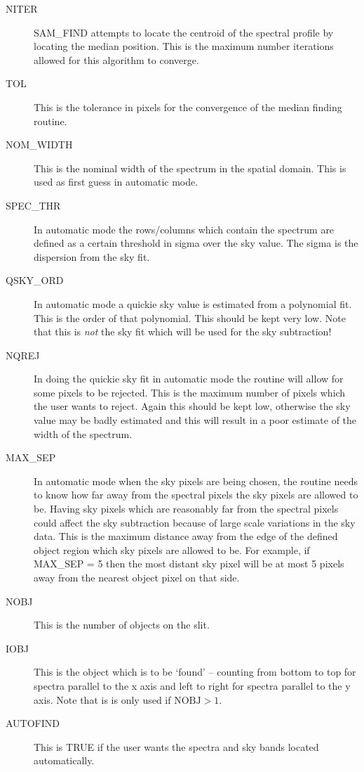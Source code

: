 \begin{description}
\begin{description}

\item[NITER] SAM\_FIND attempts to locate the centroid of the spectral profile
by locating the median position.  This is the maximum number iterations
allowed for this algorithm to converge.

\item[TOL] This is the tolerance in pixels for the convergence of the median
finding routine.

\item[NOM\_WIDTH] This is the nominal width of the spectrum in the spatial
domain.  This is used as first guess in automatic mode.

\item[SPEC\_THR] In automatic mode the rows/columns which contain the spectrum
are defined as a certain threshold in sigma over the sky value.  The sigma is
the dispersion from the sky fit.

\item[QSKY\_ORD] In automatic mode a quickie sky value is estimated from a
polynomial fit.  This is the order of that polynomial.  This should be kept
very low.  Note that this is {\em not} the sky fit which will be used for the
sky subtraction!

\item[NQREJ] In doing the quickie sky fit in automatic mode the routine will
allow for some pixels to be rejected.  This is the maximum number of pixels
which the user wants to reject.  Again this should be kept low, otherwise the
sky value may be badly estimated and this will result in a poor estimate of
the width of the spectrum.

\item[MAX\_SEP]  In automatic mode when the sky pixels are being chosen, the
routine needs to know how far away from the spectral pixels the sky pixels are
allowed to be.  Having sky pixels which are reasonably far from the spectral
pixels could affect the sky subtraction because of large scale variations in
the sky data.  This is the maximum distance away from the edge of the defined
object region which sky pixels are allowed to be. For example, if MAX\_SEP = 5
then the most distant sky pixel will be at most 5 pixels away from the nearest
object pixel on that side.

\item[NOBJ] This is the number of objects on the slit.

\item[IOBJ] This is the object which is to be `found' -- counting from bottom
to top for spectra parallel to the x axis and left to right for spectra
parallel to the y axis.  Note that is is only used if $\mbox{NOBJ} > 1$.

\item[AUTOFIND] This is TRUE if the user wants the spectra and sky bands
located automatically.

\end{description}
\end{description}

